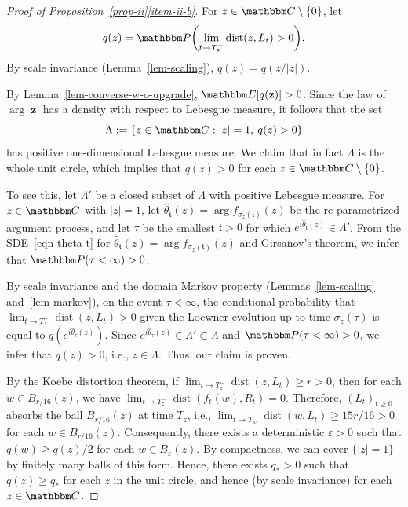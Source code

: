 \documentclass[11pt]{article}
\theoremstyle{plain}
\theoremstyle{definition}
\numberwithin{equation}{section}
\newcommand{\eqb}{\begin{equation}}
\newcommand{\eqe}{\end{equation}}
\newcommand{\eqbn}{\begin{equation*}}
\newcommand{\eqen}{\end{equation*}}
\newcommand{\BB}{\mathbbm}
\newcommand{\op}{\operatorname}
\newcommand{\ep}{\varepsilon}
\newcommand{\rta}{\rightarrow}
\newcommand{\wh}{\widehat}
\newcommand{\dist}{{\operatorname{dist}}}
\newcommand{\zz}{{\op{\mathbf{z}}}}
\newcommand{\tz}{{\mathfrak t}}
\let\originalleft\left
\let\originalright\right
\renewcommand{\left}{\mathopen{}\mathclose\bgroup\originalleft}
\renewcommand{\right}{\aftergroup\egroup\originalright}
\begin{document}
\begin{proof}[Proof of Proposition~{\hyperref[item-ii-b]{\ref*{prop-ii}\ref*{item-ii-b}}}]
For $z \in \BB C\setminus \{0\}$, let 
\eqbn
q(z) = \BB P\left( \lim_{t \rta T_{z}^-} \dist(z,L_t) > 0 \right) .
\eqen
By scale invariance (Lemma~\ref{lem-scaling}), $q(z) = q( z/|z|) $. 

By Lemma~\ref{lem-converse-w-o-upgrade}, $\BB E[q(\zz)] > 0$. 
Since the law of $\arg\zz$ has a density with respect to Lebesgue measure, it follows that the set  
\eqb
\Lambda := \left\{z\in \BB C : |z| =1 , \: q(z)  > 0 \right\} 
\eqe
has positive one-dimensional Lebesgue measure.
We claim that in fact $\Lambda$ is the whole unit circle, which implies that $q(z) > 0$ for each $z\in\BB C\setminus \{0\}$. 
 
To see this, let $\Lambda'$ be a closed subset of $\Lambda$ with positive Lebesgue measure. For $z\in \BB C$ with $|z|=1$, let $\wh\theta_\tz(z) = \arg f_{\sigma_z(\tz)}(z)$ be the re-parametrized argument process, and let $\tau$ be the smallest $\tz > 0$ for which $e^{i\wh\theta_\tz(z)} \in \Lambda'$. 
From the SDE~\eqref{eqn-theta-t} for $\wh\theta_\tz(z) = \arg f_{\sigma_z(\tz)}(z)$ and Girsanov's theorem, we infer that $\BB P(\tau < \infty) > 0$. 

By scale invariance and the domain Markov property (Lemmas~\ref{lem-scaling} and~\ref{lem-markov}), on the event $\tau < \infty$, the conditional probability that $\lim_{t\rta T_z^-} \dist(z,L_t)  >  0$ given the Loewner evolution up to time $\sigma_z(\tau)$ is equal to $q( e^{i\wh\theta_\tau(z)})$. Since $e^{i\wh\theta_\tau(z)} \in \Lambda' \subset \Lambda$ and $\BB P(\tau < \infty) > 0$, we infer that $q(z) > 0$, i.e., $z\in\Lambda$. Thus, our claim is proven. 

By the Koebe distortion theorem, if $\lim_{t\rta T_z^-} \dist(z,L_t) \geq r > 0$, then for each $w \in B_{r/16}(z)$, we have $\lim_{t\rta T_z^-} \dist(f_t(w),R_t) = 0$. Therefore, $(L_t)_{t\geq0 }$ absorbs the ball $B_{r/16}(z)$ at time $T_z$, i.e., $\lim_{t\rta T_w^-} \dist(w,L_t) \geq 15 r/16 > 0$ for each $w \in B_{r/16}(z)$.  
Consequently, there exists a deterministic $\ep > 0$ such that $q(w) \geq q(z)/2$ for each $w \in B_\ep(z)$. 
By compactness, we can cover $\{|z|=1\}$ by finitely many balls of this form. Hence, there exists $q_* > 0$ such that $q(z) \geq q_*$ for each $z$ in the unit circle, and hence (by scale invariance) for each $z\in\BB C$. 


\end{proof}
\end{document}
